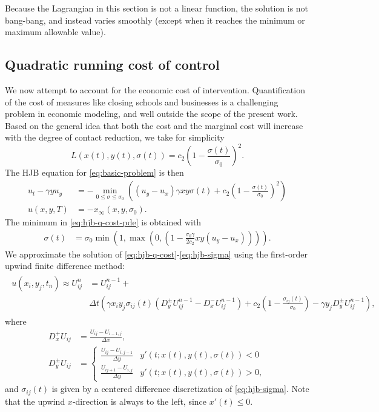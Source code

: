 \documentclass[english,12pt,letter]{article}
\newcommand{\Rnot}{\sigma_0}
\newcommand{\Sinf}{x_\infty}
\newcommand{\Dt}{\Delta t}
\newcommand{\Dx}{\Delta x}
\newcommand{\Dy}{\Delta y}
\begin{document}
{\color{red}
Because the Lagrangian in this section is not a linear function, the
solution is not bang-bang, and instead varies smoothly (except when it
reaches the minimum or maximum allowable value).
}


\subsection{Quadratic running cost of control}
We now attempt to account for the economic cost of intervention.  Quantification
of the cost of measures like closing schools and businesses is a challenging
problem in economic modeling, and well outside the scope of the present work.
Based on the general idea that both the cost and the marginal cost will increase
with the degree of contact reduction, we take for simplicity
$$
    L(x(t),y(t),\sigma(t)) = c_2 \left(1-\frac{\sigma(t)}{\Rnot}\right)^2.
$$
The HJB equation for \eqref{eq:basic-problem} is then
\begin{subequations} \label{eq:hjb-q-cost}
\begin{align} \label{eq:hjb-q-cost-pde}
    u_t - \gamma y u_y & = - \min_{0\le \sigma\le \Rnot} \left((u_y-u_x)\gamma x y \sigma(t) + c_2 \left(1-\frac{\sigma(t)}{\Rnot}\right)^2 \right) \\
    u(x,y,T) & = -\Sinf(x,y,\Rnot).
\end{align}
\end{subequations}
The minimum in \eqref{eq:hjb-q-cost-pde} is obtained with
\begin{align} \label{eq:hjb-sigma}
    \sigma(t) & = \Rnot\min\left(1,\max\left(0,\left(1-\frac{\Rnot\gamma}{2c_2}x y (u_y-u_x)\right)\right)\right).
\end{align}
We approximate the solution of \eqref{eq:hjb-q-cost}-\eqref{eq:hjb-sigma} using the first-order
upwind finite difference method:
\begin{align}
\begin{split}
    u(x_i,y_j,t_n) \approx U^{n}_{ij} & = U^{n-1}_{ij} + \\
    & \Dt \left(\gamma x_i y_j \sigma_{ij}(t) (D^\pm_y U^{n-1}_{ij} - D^-_x U^{n-1}_{ij}) 
        + c_2\left(1-\frac{\sigma_{ij}(t)}{\Rnot}\right) - \gamma y_j D^\pm_y U^{n-1}_{ij}\right),
\end{split}
\end{align}
where
\begin{align*}
    D^+_x U_{ij} & = \frac{U_{ij}-U_{i-1,j}}{\Dx}, \\
    D^\pm_y U_{ij} & =
    \begin{cases}
        \frac{U_{ij}-U_{i,j-1}}{\Dy} & y'(t;x(t),y(t),\sigma(t))<0 \\
        \frac{U_{ij+1}-U_{i,j}}{\Dy} & y'(t;x(t),y(t),\sigma(t))>0,
    \end{cases}
\end{align*}
and $\sigma_{ij}(t)$ is given by a centered difference discretization of \eqref{eq:hjb-sigma}.
Note that the upwind $x$-direction is always to the left, since $x'(t)\le0$.
\end{document}
